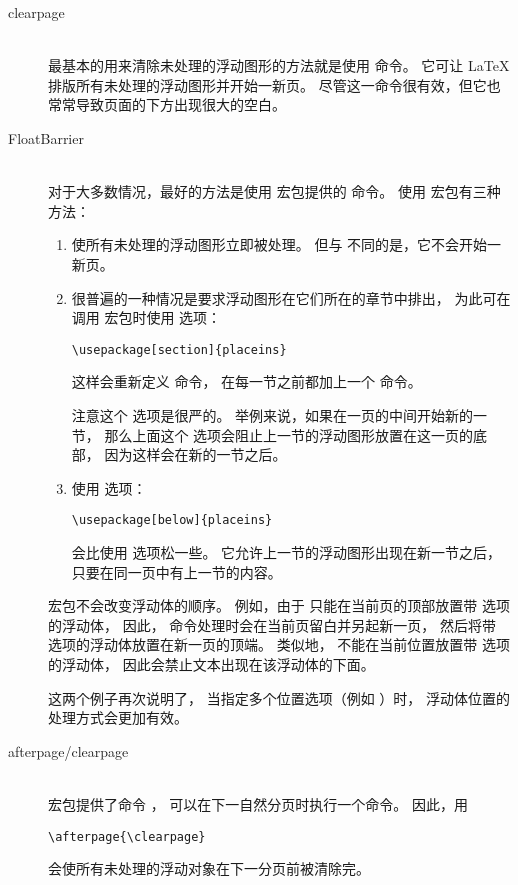 \begin{description}
	\item [clearpage] \mbox{} \\
	最基本的用来清除未处理的浮动图形的方法就是使用  命令。
	它可让 \LaTeX{} 排版所有未处理的浮动图形并开始一新页。
	尽管这一命令很有效，但它也常常导致页面的下方出现很大的空白。
	
	\item [FloatBarrier] \mbox{} \\
	对于大多数情况，最好的方法是使用  宏包提供的  命令。
	使用  宏包有三种方法：
	\begin{enumerate}
		\item {} 使所有未处理的浮动图形立即被处理。
		但与  不同的是，它不会开始一新页。
		\item 很普遍的一种情况是要求浮动图形在它们所在的章节中排出，
		为此可在调用  宏包时使用  选项：
\begin{lstlisting}
\usepackage[section]{placeins}
\end{lstlisting}
		这样会重新定义  命令，
		在每一节之前都加上一个  命令。
		
		注意这个 \opt{[section]} 选项是很严的。
		举例来说，如果在一页的中间开始新的一节，
		那么上面这个  选项会阻止上一节的浮动图形放置在这一页的底部，
		因为这样会在新的一节之后。
		\item 使用  选项：
\begin{lstlisting}
\usepackage[below]{placeins}
\end{lstlisting}
		会比使用  选项松一些。
		它允许上一节的浮动图形出现在新一节之后，只要在同一页中有上一节的内容。
	\end{enumerate}
	 宏包不会改变浮动体的顺序。
	例如，由于  只能在当前页的顶部放置带 \opt{[t]} 选项的浮动体，
	因此， 命令处理时会在当前页留白并另起新一页，
	然后将带 \opt{[t]} 选项的浮动体放置在新一页的顶端。
	类似地， 不能在当前位置放置带 \opt{[b]} 选项的浮动体，
	因此会禁止文本出现在该浮动体的下面。
	
	这两个例子再次说明了，
	当指定多个位置选项（例如 ）时，
	浮动体位置的处理方式会更加有效。

	\item [afterpage/clearpage] \mbox{} \\
	 宏包提供了命令 ，
	可以在下一自然分页时执行一个命令。
	因此，用
\begin{lstlisting}
\afterpage{\clearpage}
\end{lstlisting}
	会使所有未处理的浮动对象在下一分页前被清除完。
	

\end{description}
